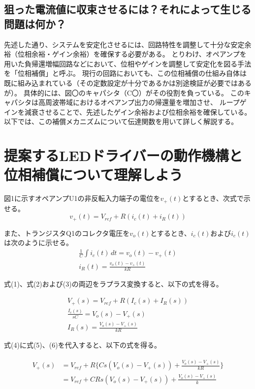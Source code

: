 \documentclass{ltjsarticle}
\begin{document}
\subsection{狙った電流値に収束させるには？それによって生じる問題は何か？}
先述した通り、システムを安定化させるには、回路特性を調整して十分な安定余裕（位相余裕・ゲイン余裕）を確保する必要がある。
とりわけ、オペアンプを用いた負帰還増幅回路などにおいて、位相やゲインを調整して安定化を図る手法を「位相補償」と呼ぶ。
現行の回路においても、この位相補償の仕組み自体は既に組み込まれている（その定数設定が十分であるかは別途検証が必要ではあるが）。
具体的には、図〇のキャパシタ（C〇）がその役割を負っている。
このキャパシタは高周波帯域におけるオペアンプ出力の帰還量を増加させ、
ループゲインを減衰させることで、先述したゲイン余裕および位相余裕を確保している。
以下では、この補償メカニズムについて伝達関数を用いて詳しく解説する。


\section{提案するLEDドライバーの動作機構と位相補償について理解しよう}


図1に示すオペアンプU1の非反転入力端子の電位を$v_{+}(t)$とするとき、次式で示せる。
\begin{equation}
v_{+}(t) = V_{ref} + R(i_{c}(t) + i_{R}(t))
\end{equation}

また、トランジスタQ1のコレクタ電圧を$v_{o}(t)$とするとき、$i_{c}(t)$および$i_{c}(t)$は次のように示せる。
\begin{gather}
\frac{1}{C} \int i_{c}(t) \, dt = v_{o}(t) - v_{+}(t) \\
i_{R}(t) = \frac{v_{o}(t) - v_{+}(t)}{kR}
\end{gather}

式(1)、式(2)および(3)の両辺をラプラス変換すると、以下の式を得る。

\begin{gather}
    V_{+}(s) = V_{ref} + R(I_{c}(s) + I_{R}(s)) \\
    \frac{I_{c}(s)}{sC} = V_{o}(s) - V_{+}(s) \\
    I_{R}(s) = \frac{V_{o}(s) - V_{+}(s)}{kR}
\end{gather}

式(4)に式(5)、(6)を代入すると、以下の式を得る。

\begin{gather*}
\begin{aligned}
    V_{+}(s) &= V_{ref} + R\{Cs(V_{o}(s) -  V_{+}(s)) + \frac{V_{o}(s) - V_{+}(s)}{kR}\} \\
    &= V_{ref} + CRs(V_{o}(s) -  V_{+}(s)) + \frac{V_{o}(s) - V_{+}(s)}{k}
\end{aligned}
\end{gather*}
\end{document}
